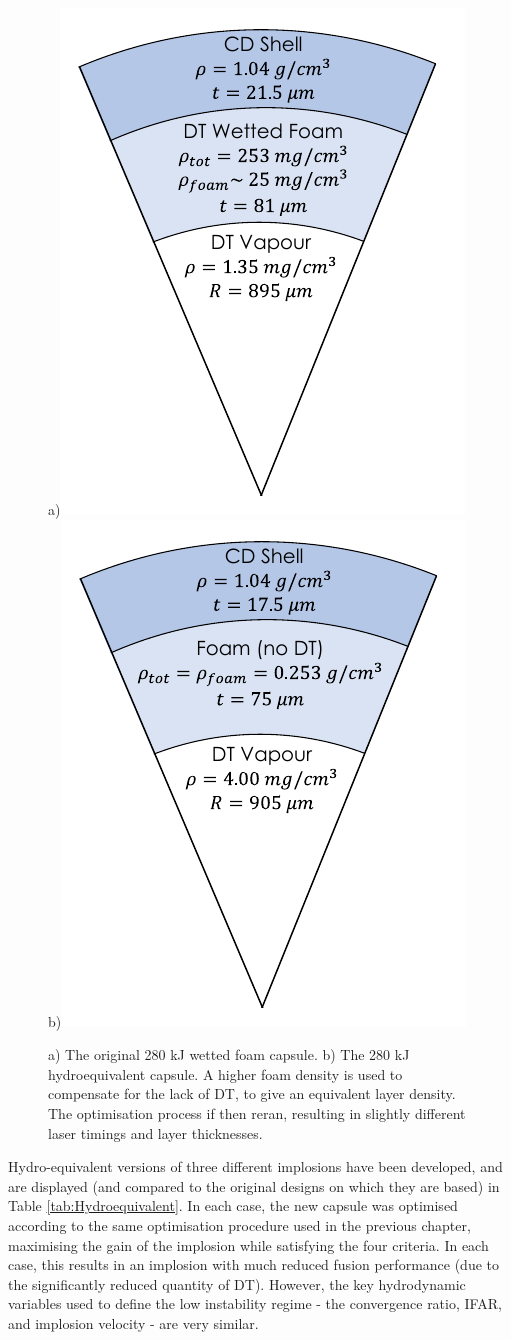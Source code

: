 \begin{figure} 
\centering     %
\subfigure a){\label{fig:280Cap}\includegraphics[width=.35\textwidth]{figures/LowCR/280Capsule.pdf}}
\subfigure b){\label{fig:280Hydro}\includegraphics[width=.35\textwidth]{figures/LowCR/280Hydro.pdf}}
\caption{\label{fig:Hydroequivalent} a) The original 280 kJ wetted foam capsule. b) The 280 kJ hydroequivalent capsule. A higher foam density is used to compensate for the lack of DT, to give an equivalent layer density. The optimisation process if then reran, resulting in slightly different laser timings and layer thicknesses.}
\end{figure}

Hydro-equivalent versions of three different implosions have been developed, and are displayed (and compared to the original designs on which they are based) in Table \ref{tab:Hydroequivalent}. In each case, the new capsule was optimised according to the same optimisation procedure used in the previous chapter, maximising the gain of the implosion while satisfying the four criteria. In each case, this results in an implosion with much reduced fusion performance (due to the significantly reduced quantity of DT). However, the key hydrodynamic variables used to define the low instability regime - the convergence ratio, IFAR, and implosion velocity - are very similar.


